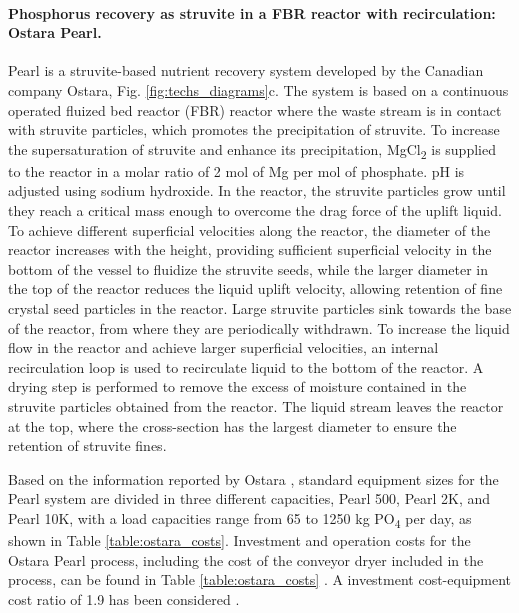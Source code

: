 \documentclass[10pt,a4paper]{article}
\begin{document}
\paragraph{Phosphorus recovery as struvite in a FBR reactor with recirculation: Ostara Pearl.}
Pearl is a struvite-based nutrient recovery system developed by the Canadian company Ostara, Fig. \ref{fig:techs_diagrams}c. The system is based on a continuous operated fluized bed reactor (FBR) reactor where the waste stream is in contact with struvite particles, which promotes the precipitation of struvite. To increase the supersaturation of struvite and enhance its precipitation, MgCl\textsubscript{2} is supplied to the reactor in a molar ratio of 2 mol of Mg per mol of phosphate. pH is adjusted using sodium hydroxide. In the reactor, the struvite particles grow until they reach a critical mass enough to overcome the drag force of the uplift liquid. To achieve different superficial velocities along the reactor, the diameter of the reactor increases with the height, providing sufficient superficial velocity in the bottom of the vessel to fluidize the struvite seeds, while the larger diameter in the top of the reactor reduces the liquid uplift velocity, allowing retention of fine crystal seed particles in the reactor. Large struvite particles sink towards the base of the reactor, from where they are periodically withdrawn. To increase the liquid flow in the reactor and achieve larger superficial velocities, an internal recirculation loop is used to recirculate liquid to the bottom of the reactor. A drying step is performed to remove the excess of moisture contained in the struvite particles obtained from the reactor. The liquid stream leaves the reactor at the top, where the cross-section has the largest diameter to ensure the retention of struvite fines.

Based on the information reported by Ostara , standard equipment sizes for the Pearl system are divided in three different capacities, Pearl 500, Pearl 2K, and Pearl 10K, with a load capacities range from 65 to 1250 kg PO\textsubscript{4} per day, as shown in Table \ref{table:ostara_costs}. Investment and operation costs for the Ostara Pearl process, including the cost of the conveyor dryer included in the process, can be found in Table \ref{table:ostara_costs} . A investment cost-equipment cost ratio of 1.9 has been considered .
\end{document}
